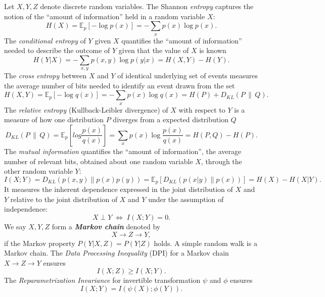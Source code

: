\documentclass[11pt]{article}
\def\E{\mathbb{E}}
\begin{document}
Let $X, Y, Z$ denote discrete random variables. The Shannon \emph{entropy} captures the notion of the ``amount of information'' held in a random variable $X$:
\begin{equation}
H(X) = \E_p[-\log p(x)] = -\sum_{x} p(x) \log p(x).
\end{equation}
The \emph{conditional entropy} of $Y$ given $X$ quantifies the ``amount of information'' needed to describe the outcome of $Y$ given that the value of $X$ is known
\begin{equation}
H(Y\vert X) = -\sum_{x,y} p(x,y) \log p(y\vert x) = H(X,Y) - H(Y).
\end{equation}
The \emph{cross entropy} between $X$ and $Y$ of identical underlying set of events measures the average number of bits needed to identify an event drawn from the set
\begin{equation}
H(X, Y) = \E_p[-\log q(x)] = -\sum_{x} p(x)\log q(x) = H(P) + D_{KL}(P \,\rVert\, Q).
\end{equation}
The \emph{relative entropy} (Kullback-Leibler divergence) of $X$ with respect to $Y$ is a measure of how one distribution $P$ diverges from a expected distribution $Q$
\begin{equation}
D_{KL}(P \,\rVert\, Q)= \E_p[log \frac{p(x)}{q(x)}] = \sum_{x} p(x) \log \frac{p(x)}{q(x)} = H(P, Q) - H(P).
\end{equation}
The \emph{mutual information} quantifies the ``amount of information'', the average number of relevant bits, obtained about one random variable $X$, through the other random variable $Y$:
\begin{equation}
I(X;Y) = D_{KL}(p(x,y) \rVert p(x)p(y)) = \E_p[D_{KL}(p(x\vert y) \rVert p(x) )] = H(X) - H(X\vert Y).
\end{equation}
It measures the inherent dependence expressed in the joint distribution of $X$ and $Y$ relative to the joint distribution of $X$ and $Y$ under the assumption of independence:
\begin{equation}
X \perp Y \; \Leftrightarrow \; I(X;Y) = 0.
\end{equation}
We say $X,Y,Z$ form a \textit{\textbf{Markov chain}} denoted by
\begin{equation}
X\rightarrow Z \rightarrow Y,
\end{equation}
if the Markov property $P(Y\vert X,Z) = P(Y\vert Z)$ holds. A simple random walk is a Markov chain.
The \emph{Data Processing Inequality} (DPI) for a Markov chain ${X\rightarrow Z \rightarrow Y}$ ensures
\begin{equation}
I(X;Z) \geq I(X;Y).
\label{eq:dpi}
\end{equation}
The \emph{Reparametrization Invariance} for invertible transformation $\psi$ and $\phi$ ensures
\begin{equation}
I(X;Y) = I(\psi(X); \phi(Y)).
\label{eq:repara}
\end{equation}
\end{document}
